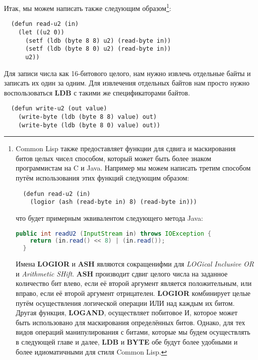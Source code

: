 Итак, мы можем написать  также следующим образом\footnote{Common Lisp также предоставляет функции для сдвига и маскирования битов целых чисел способом, который может быть более знаком программистам на C и Java. Например мы можем написать  третим способом путём использования этих функций следующим образом:

\begin{lstlisting}
  (defun read-u2 (in)
    (logior (ash (read-byte in) 8) (read-byte in)))
\end{lstlisting}

что будет примерным эквивалентом следующего метода Java:

\begin{lstlisting}[language=Java]
  public int readU2 (InputStream in) throws IOException {
    return (in.read() << 8) | (in.read());
  }
\end{lstlisting}

Имена \textbf{LOGIOR} и \textbf{ASH} являются сокращенифми для \textit{LOGical Inclusive
  OR} и \textit{Arithmetic SHift}. \textbf{ASH} производит сдвиг целого числа на заданное
количество бит влево, если её второй аргумент является положительным, или вправо, если её
второй аргумент отрицателен. \textbf{LOGIOR} комбинирует целые путём осуществления
логической операции ИЛИ над каждым их битом. Другая функция, \textbf{LOGAND}, осуществляет
побитовое И, которое может быть использовано для маскирования определённых битов. Однако,
для тех видов операций манипулирования с битами, которые мы будем осуществлять в следующей
главе и далее, \textbf{LDB} и \textbf{BYTE} обе будут более удобными и более идиоматичными
для стиля Common Lisp.}:

\begin{lstlisting}
  (defun read-u2 (in)
    (let ((u2 0))
      (setf (ldb (byte 8 8) u2) (read-byte in))
      (setf (ldb (byte 8 0) u2) (read-byte in))
      u2))
\end{lstlisting}

Для записи числа как 16-битового целого, нам нужно извлечь отдельные байты и записать их
один за одним. Для извлечения отдельных байтов нам просто нужно воспользоваться
\textbf{LDB} с такими же спецификаторами байтов.

\begin{lstlisting}
  (defun write-u2 (out value)
    (write-byte (ldb (byte 8 8) value) out)
    (write-byte (ldb (byte 8 0) value) out))
\end{lstlisting}

